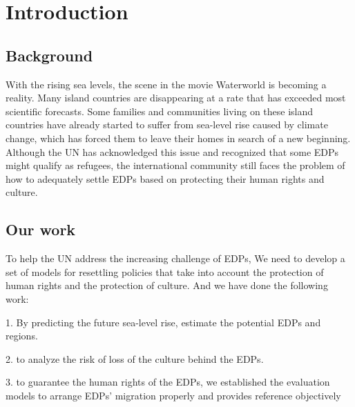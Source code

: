 \documentclass[12pt]{article}  %
\begin{document}
\maketitle  %
\tableofcontents  %


\section{Introduction}
\subsection{Background}



With the rising sea levels, the scene in the movie Waterworld is becoming a reality. Many island countries are disappearing at a rate that has exceeded most scientific forecasts. Some families and communities living on these island countries have already started to suffer from sea-level rise caused by climate change, which has forced them to leave their homes in search of a new beginning. Although the UN has acknowledged this issue and recognized that some EDPs might qualify as refugees, the international community still faces the problem of how to adequately settle EDPs based on protecting their human rights and culture.




\subsection{Our work}
To help the UN address the increasing challenge of EDPs, We need to develop a set of models for resettling policies that take into account the protection of human rights and the protection of culture. And we have done the following work: 

1. By predicting the future sea-level rise, estimate the potential EDPs and regions.

2. to analyze the risk of loss of the culture behind the EDPs. 

3. to guarantee the human rights of the EDPs, we established the evaluation models to arrange EDPs’ migration properly and provides  reference objectively 
\end{document}
